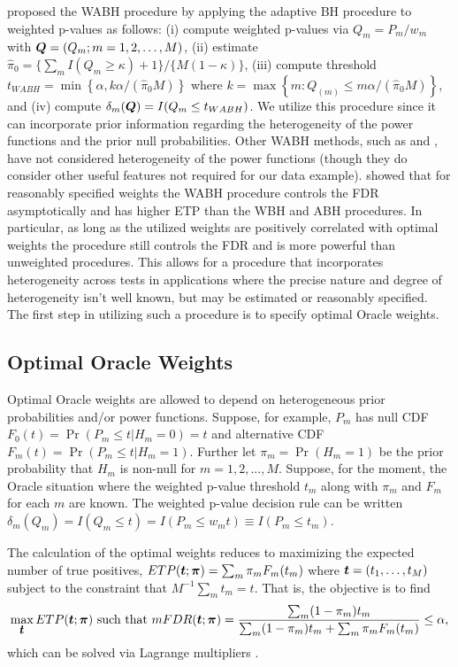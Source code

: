 \documentclass[bimj,fleqn]{w-art}
\newcommand{\Q}{{\mbox{\boldmath $Q$}}}
\newcommand{\mbf}[1]{\mbox{\boldmath${#1}$}}
\theoremstyle{plain}
\theoremstyle{definition}
\begin{document}
\cite{Habiger2017} proposed the WABH procedure by applying the adaptive BH procedure to weighted p-values as follows: (i) compute weighted p-values via $Q_m = P_m/w_m$ with $\Q = (Q_m; m = 1, 2,\ldots, M)$, (ii) estimate $\hat\pi_0 = \{\sum_m I(Q_m\geq \kappa) + 1\}/\{M(1-\kappa)\}$, (iii) compute threshold $t_{WABH} = \min\left\{\alpha, k \alpha/(\hat\pi_0 M)\right\}$ where $k = \max\left\{m: Q_{(m)}\leq m \alpha/(\hat\pi_0 M)\right\}$, and (iv) compute $\delta_m(\Q) = I(Q_m\leq t_{WABH})$. We utilize this procedure since it can incorporate prior information regarding the heterogeneity of the power functions and the prior null probabilities. Other WABH methods, such as \cite{ramdas2019unified} and \cite{biswas2022new}, have not considered heterogeneity of the power functions (though they do consider other useful features not required for our data example). \cite{Habiger2017} showed that for reasonably specified weights the WABH procedure controls the FDR asymptotically and has higher ETP than the WBH and ABH procedures. In particular, as long as the utilized weights are positively correlated with optimal weights the procedure still controls the FDR and is more powerful than unweighted procedures. This allows for a procedure that incorporates heterogeneity across tests in applications where the precise nature and degree of heterogeneity isn't well known, but may be estimated or reasonably specified. The first step in utilizing such a procedure is to specify optimal Oracle weights.



\subsection{Optimal Oracle Weights}\label{sec.opt.weight}
Optimal Oracle weights are allowed to depend on heterogeneous prior probabilities and/or power functions.  Suppose, for example, $P_m$ has null CDF $F_0(t) = \Pr(P_m\leq t|H_m=0)=t$ and alternative CDF $F_m(t) = \Pr(P_m\leq t|H_m=1)$.  Further let $\pi_m = \Pr(H_m = 1)$ be the prior probability that $H_m$ is non-null for $m = 1, 2, ..., M$.   Suppose, for the moment, the Oracle situation where the weighted p-value threshold $t_m$ along with $\pi_m$ and $F_m$ for each $m$ are known.  The weighted p-value decision rule can be written $\delta_m(Q_m) = I(Q_m \leq t) = I(P_m \leq w_mt) \equiv I(P_m \leq t_m)$. 


The calculation of the optimal weights reduces to maximizing the expected number of true positives, $ETP(\mbf{t};\mbf{\pi}) = \sum_m \pi_m F_m(t_m)$ where $\mbf{t}=(t_1,\ldots,t_M)$ subject to the constraint that $M^{-1}\sum_mt_m = t$. That is, the objective is to find
%
$$\max_{\mbf{t}}ETP(\mbf{t};\mbf{\pi}) \mbox{ such that } mFDR(\mbf{t};\mbf{\pi}) = \frac{\sum_m (1-\pi_m)t_m}{\sum_m (1-\pi_m)t_m+\sum_m \pi_m F_m(t_m)} \leq \alpha,$$
%
which can be solved via Lagrange multipliers \citep{Habiger2017}. 
\end{document}
